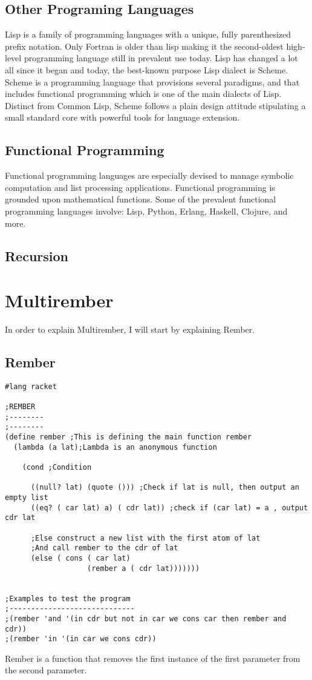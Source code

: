 \documentclass{article}
\begin{document}
\subsection{Other Programing Languages}
Lisp is a family of programming languages with a unique, fully parenthesized prefix notation. Only Fortran is older than lisp making it the second-oldest high-level programming language still in prevalent use today. Lisp has changed a lot all since it began and today, the best-known purpose Lisp dialect is Scheme.\\


Scheme is a programming language that provisions several paradigms, and that includes functional programming which is one of the main dialects of Lisp. Distinct from Common Lisp, Scheme follows a plain design attitude stipulating a small standard core with powerful tools for language extension.\\
\subsection{Functional Programming}
Functional programming languages are especially devised to manage symbolic computation and list processing applications. Functional programming is grounded upon mathematical functions. Some of the prevalent functional programming languages involve: Lisp, Python, Erlang, Haskell, Clojure, and more.

\subsection{Recursion}
\newpage
\section{Multirember}\label{sec:multirember}

In order to explain Multirember, I will start by explaining Rember.
\subsection{Rember}
\begin{lstlisting}
#lang racket

;REMBER
;--------
;--------
(define rember ;This is defining the main function rember
  (lambda (a lat);Lambda is an anonymous function
    
    (cond ;Condition
      
      ((null? lat) (quote ())) ;Check if lat is null, then output an empty list
      ((eq? ( car lat) a) ( cdr lat)) ;check if (car lat) = a , output cdr lat

      ;Else construct a new list with the first atom of lat
      ;And call rember to the cdr of lat
      (else ( cons ( car lat) 
                   (rember a ( cdr lat)))))))


;Examples to test the program
;-----------------------------
;(rember 'and '(in cdr but not in car we cons car then rember and cdr))
;(rember 'in '(in car we cons cdr))
\end{lstlisting}
Rember is a function that removes the first instance of the first parameter from the second parameter.
\end{document}
